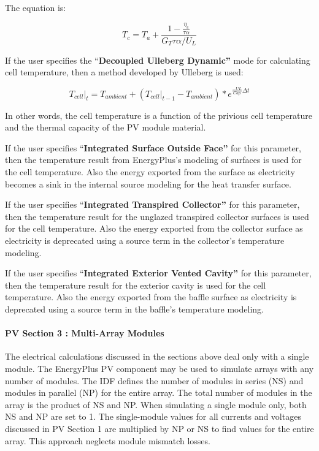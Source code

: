 The equation is:

\begin{equation}
  T_c = T_a + \frac{1-\frac{\eta_c}{\tau \alpha}}{G_T \tau\alpha/U_L}
\end{equation}

If the user specifies the ``\textbf{Decoupled Ulleberg Dynamic''} mode for calculating cell temperature, then a method developed by Ulleberg is used:

\begin{equation}
{\left. {{T_{cell}}} \right|_t} = {T_{ambient}} + \left( {{{\left. {{T_{cell}}} \right|}_{t - 1}} - {T_{ambient}}} \right)*{e^{\frac{{ - UL}}{{Cap}}\Delta t}}
\end{equation}

In other words, the cell temperature is a function of the privious cell temperature and the thermal capacity of the PV module material.

If the user specifies ``\textbf{Integrated Surface Outside Face''} for this parameter, then the temperature result from EnergyPlus's modeling of surfaces is used for the cell temperature. Also the energy exported from the surface as electricity becomes a sink in the internal source modeling for the heat transfer surface.

If the user specifies ``\textbf{Integrated Transpired Collector''} for this parameter, then the temperature result for the unglazed transpired collector surfaces is used for the cell temperature. Also the energy exported from the collector surface as electricity is deprecated using a source term in the collector's temperature modeling.

If the user specifies ``\textbf{Integrated Exterior Vented Cavity''} for this parameter, then the temperature result for the exterior cavity is used for the cell temperature. Also the energy exported from the baffle surface as electricity is deprecated using a source term in the baffle's temperature modeling.

\paragraph{PV Section 3 : Multi-Array Modules}\label{pv-section-3-multi-array-modules}

The electrical calculations discussed in the sections above deal only with a single module. The EnergyPlus PV component may be used to simulate arrays with any number of modules. The IDF defines the number of modules in series (NS) and modules in parallel (NP) for the entire array. The total number of modules in the array is the product of NS and NP. When simulating a single module only, both NS and NP are set to 1. The single-module values for all currents and voltages discussed in PV Section 1 are multiplied by NP or NS to find values for the entire array. This approach neglects module mismatch losses.

